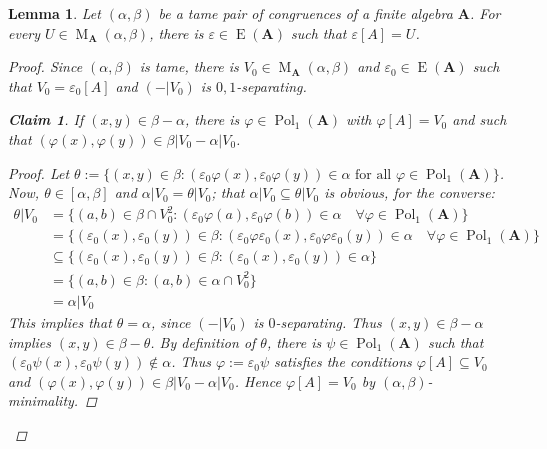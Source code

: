 \documentclass{amsart}
\theoremstyle{plain}
\newtheorem{lemma}[theorem]{Lemma}
\newtheorem{claim}{Claim}
\theoremstyle{definition}
\theoremstyle{remark}
\def\phi{\varphi}
\def\epsilon{\varepsilon}
\def\A{\forall}
\DeclareMathOperator{\Pol}{Pol}
\DeclareMathOperator{\Id}{E}
\DeclareMathOperator{\M}{M}
\begin{document}
\begin{lemma}
    \label{lemma_pol}
    Let $(\alpha, \beta)$ be a tame pair of congruences of a finite algebra $\mathbf{A}$. 
    For every $U \in \M_{\mathbf{A}}(\alpha, \beta)$, there  is $\epsilon \in \Id(\mathbf{A})$ such that $\epsilon[A]=U$. 
    \begin{proof}
        Since $(\alpha, \beta)$ is tame, there is $V_0 \in \M_\mathbf{A}(\alpha,\beta)$ and $\epsilon_0 \in \Id(\mathbf{A})$ such that $V_0 = \epsilon_0[A]$ and $(-|V_0)$ is $0,1$-separating. 
        \begin{claim}
            \label{lemma_pol_claim1}
            If $(x,y) \in \beta - \alpha$, there is $\phi \in \Pol_1(\mathbf{A})$ with $\phi[A]=V_0$ and such that $(\phi(x), \phi(y)) \in \beta|V_0 - \alpha|V_0$. 
            \begin{proof}
                Let $\theta:=\{(x,y) \in \beta : (\epsilon_0 \phi (x), \epsilon_0 \phi(y)) \in \alpha \text{ for all } \phi \in \Pol_1(\mathbf{A})\}$. 
                Now, $\theta \in [\alpha, \beta]$ and $\alpha |V_0 = \theta|V_0$; 
                that $\alpha |V_0 \subseteq \theta|V_0$ is obvious, for the converse: 
                \begin{align*}
                    \theta|V_0 & = \{ (a,b) \in \beta \cap V^2_0: (\epsilon_0 \phi (a), \epsilon_0 \phi(b)) \in \alpha \quad \A \phi \in \Pol_1(\mathbf{A})\}  \\
                    & = \{(\epsilon_0(x), \epsilon_0(y)) \in \beta : (\epsilon_0 \phi \epsilon_0 (x), \epsilon_0 \phi \epsilon_0 (y)) \in \alpha \quad \A\phi \in \Pol_1(\mathbf{A})\}\\ 
                    & \subseteq \{(\epsilon_0(x), \epsilon_0(y)) \in \beta : (\epsilon_0 (x), \epsilon_0 (y)) \in \alpha \}\\ 
                    & = \{(a,b) \in \beta : (a, b ) \in \alpha \cap V^2_0\}\\ 
                    & = \alpha | V_0 
                \end{align*} 
            This implies that $\theta = \alpha $, since $(-|V_0)$ is $0$-separating. 
            Thus $(x,y) \in \beta - \alpha$ implies $(x,y) \in \beta - \theta$. 
            By definition of $\theta$, there is $\psi \in \Pol_1(\mathbf{A})$ such that $(\epsilon_0 \psi (x), \epsilon_0\psi (y)) \notin \alpha$. 
            Thus $\phi:=\epsilon_0 \psi$ satisfies the conditions $\phi[A] \subseteq V_0$ and $(\phi(x), \phi(y)) \in \beta |V_0 - \alpha|V_0$. 
            Hence $\phi[A] = V_0$ by $(\alpha, \beta)$-minimality. 

\end{proof}
\end{claim}
\end{proof}
\end{lemma}
\end{document}
